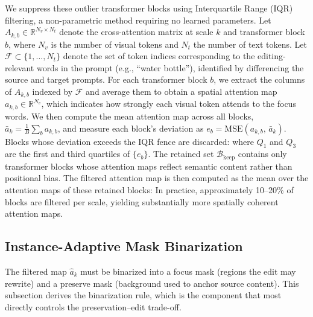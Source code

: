 We suppress these outlier transformer blocks using Interquartile Range (IQR) filtering, a non-parametric method requiring no learned parameters. Let $A_{k,b} \in \mathbb{R}^{N_v \times N_t}$ denote the cross-attention matrix at scale $k$ and transformer block $b$, where $N_v$ is the number of visual tokens and $N_t$ the number of text tokens. Let $\mathcal{F} \subset \{1, \ldots, N_t\}$ denote the set of token indices corresponding to the editing-relevant words in the prompt (e.g., ``water bottle''), identified by differencing the source and target prompts. For each transformer block $b$, we extract the columns of $A_{k,b}$ indexed by $\mathcal{F}$ and average them to obtain a spatial attention map $a_{k,b} \in \mathbb{R}^{N_v}$, which indicates how strongly each visual token attends to the focus words. We then compute the mean attention map across all blocks, $\bar{a}_k = \frac{1}{B}\sum_{b} a_{k,b}$, and measure each block's deviation as $e_b = \mathrm{MSE}(a_{k,b},\, \bar{a}_k)$. Blocks whose deviation exceeds the IQR fence are discarded:
\EqIqrFilter
where $Q_1$ and $Q_3$ are the first and third quartiles of $\{e_b\}$. The retained set $\mathcal{B}_{\mathrm{keep}}$ contains only transformer blocks whose attention maps reflect semantic content rather than positional bias. The filtered attention map is then computed as the mean over the attention maps of these retained blocks:
\EqFilteredAttn
In practice, approximately 10--20\% of blocks are filtered per scale, yielding substantially more spatially coherent attention maps.

\subsection{Instance-Adaptive Mask Binarization}
\label{sec:threshold}

The filtered map $\hat{a}_k$ must be binarized into a focus mask (regions the edit may rewrite) and a preserve mask (background used to anchor source content). This subsection derives the binarization rule, which is the component that most directly controls the preservation--edit trade-off.

